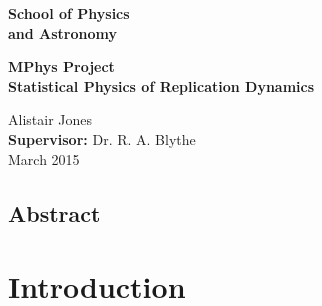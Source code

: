 \documentclass[12pt]{article}
\begin{document}

\begin{minipage}[b]{110mm}
        {\Huge\bf School of Physics\\ and Astronomy
        \vspace*{17mm}}
\end{minipage}
\hfill
\begin{minipage}[t]{40mm}               
\end{minipage}

\vspace*{2cm}
\begin{center}
        \Large\bf \Large\bf MPhys Project\\
        \LARGE\bf Statistical Physics of Replication Dynamics
\end{center}
\vspace*{0.5cm}
\begin{center}
        Alistair Jones\\  
        {\bf Supervisor:} Dr. R. A. Blythe \\          
        March 2015     
\end{center}

\begin{center}
\subsection*{Abstract}
\end{center}

\newpage
\tableofcontents

\newpage
{}

\section{Introduction}


\newpage
\end{document}
